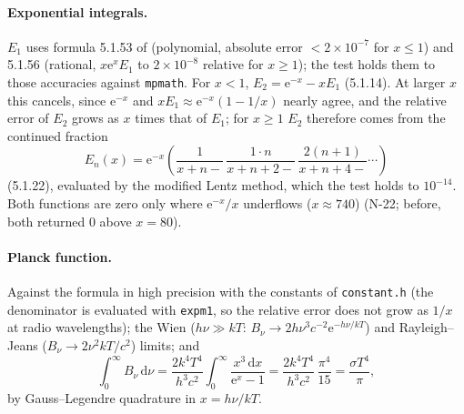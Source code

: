 \documentclass[11pt,a4paper]{article}
\newcommand{\code}[1]{\texttt{#1}}
\newcommand{\dd}{\mathrm{d}}
\newcommand{\e}{\mathrm{e}}
\begin{document}
\paragraph{Exponential integrals.} $E_1$ uses formula 5.1.53 of \citet{1972hmfw.book.....A} (polynomial, absolute error $<2\times10^{-7}$ for $x\le1$) and
5.1.56 (rational, $x\e^xE_1$ to $2\times10^{-8}$ relative for $x\ge1$);
the test holds them to those accuracies against \code{mpmath}.
For $x<1$, $E_2 = \e^{-x}-xE_1$ (5.1.14). At larger $x$ this cancels,
since $\e^{-x}$ and $xE_1\approx\e^{-x}(1-1/x)$ nearly agree, and the
relative error of $E_2$ grows as $x$ times that of $E_1$; for $x\ge1$
$E_2$ therefore comes from the continued fraction
\begin{equation}
E_n(x) = \e^{-x}\left(\frac{1}{x+n-}\,\frac{1\cdot n}{x+n+2-}\,
\frac{2(n+1)}{x+n+4-}\cdots\right)
\end{equation}
(5.1.22), evaluated by the modified Lentz method, which the test holds
to $10^{-14}$. Both functions are zero only where $\e^{-x}/x$ underflows ($x\approx740$)
(N-22; before, both returned $0$ above $x=80$).

\paragraph{Planck function.} Against the formula in high precision with
the constants of \code{constant.h} (the denominator is evaluated with
\code{expm1}, so the relative error does not grow as $1/x$ at
radio wavelengths); the Wien ($h\nu\gg kT$:
$B_\nu\to 2h\nu^3c^{-2}\e^{-h\nu/kT}$) and Rayleigh--Jeans
($B_\nu\to2\nu^2kT/c^2$) limits; and
\begin{equation}
\int_0^\infty B_\nu\,\dd\nu = \frac{2k^4T^4}{h^3c^2}\int_0^\infty\frac{x^3\,\dd x}{\e^x-1}
= \frac{2k^4T^4}{h^3c^2}\,\frac{\pi^4}{15} = \frac{\sigma T^4}{\pi},
\end{equation}
by Gauss--Legendre quadrature in $x=h\nu/kT$.
\end{document}
